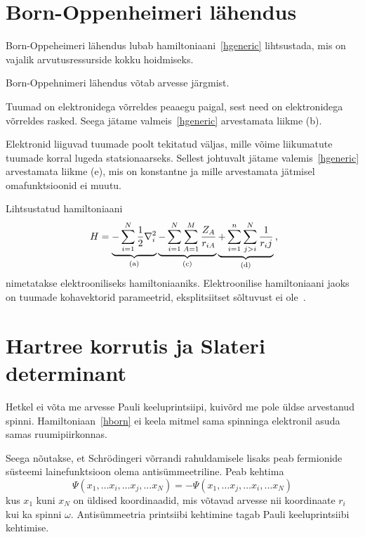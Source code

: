 \documentclass[12pt]{report}
\begin{document}
\section{Born-Oppenheimeri lähendus}\label{born-oppeheimer}

Born-Oppeheimeri lähendus lubab hamiltoniaani~\eqref{hgeneric} lihtsustada, mis on vajalik arvutusressurside kokku hoidmiseks.

Born-Oppehnimeri lähendus võtab arvesse järgmist.

Tuumad on elektronidega võrreldes peaaegu paigal, sest need on elektronidega võrreldes rasked.
Seega jätame valmeis~\eqref{hgeneric} arvestamata liikme (b).

Elektronid liiguvad tuumade poolt tekitatud väljas, mille võime liikumatute tuumade korral lugeda statsionaarseks.
Sellest johtuvalt jätame valemis~\eqref{hgeneric} arvestamata liikme (e), mis on konstantne ja mille arvestamata jätmisel omafunktsioonid ei muutu.

Lihtsustatud hamiltoniaani
\begin{equation}\label{hborn}
    H = \underbrace{-\sum_{i=1}^N\frac{1}{2}\nabla_i^2}_\mathrm{(a)}
        \underbrace{-\sum_{i=1}^N\sum_{A=1}^M\frac{Z_A}{r_{iA}}}_\mathrm{(c)}
        \underbrace{+\sum_{i=1}^n\sum_{j>i}^N\frac{1}{r_ij}}_\mathrm{(d)}\rlap{,}
\end{equation}
nimetatakse elektrooniliseks hamiltoniaaniks.
Elektroonilise hamiltoniaani jaoks on tuumade kohavektorid parameetrid, eksplitsiitset sõltuvust ei ole~\cite{szabo+ostlnud}.


\section{Hartree korrutis ja Slateri determinant}\label{hartree+slater}

Hetkel ei võta me arvesse Pauli keeluprintsiipi, kuivõrd me pole üldse arvestanud spinni.
Hamiltoniaan~\eqref{hborn} ei keela mitmel sama spinninga elektronil asuda samas ruumipiirkonnas.

Seega nõutakse, et Schrödingeri võrrandi rahuldamisele lisaks peab fermionide süsteemi lainefunktsioon olema antisümmeetriline.
Peab kehtima
\begin{equation}
    \Psi(x_1,\ldots x_i,\ldots x_j,\ldots x_N)=-\Psi(x_1,\ldots x_j,\ldots x_i,\ldots x_N)
\end{equation}
kus \(x_1\) kuni \(x_N\) on üldised koordinaadid, mis võtavad arvesse nii koordinaate \(r_i\) kui ka spinni \(\omega\).
Antisümmeetria printsiibi kehtimine tagab Pauli keeluprintsiibi kehtimise.
\end{document}
